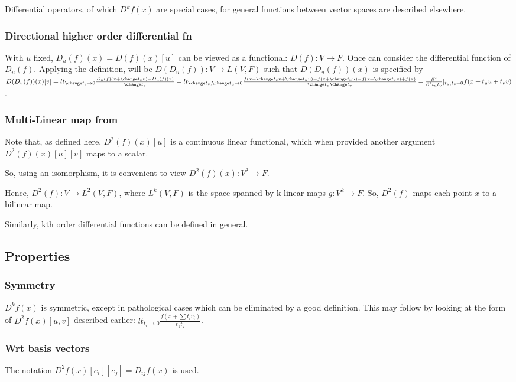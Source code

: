 \documentclass[oneside, article]{memoir}
\begin{document}
Differential operators, of which $D^{k}f(x)$ are special cases, for general functions between vector spaces are described elsewhere.

\subsubsection{Directional higher order differential fn}
With $u$ fixed, $D_u(f)(x) = D(f)(x)[u]$ can be viewed as a  functional: $D(f):V \to F$. Once can consider the differential function of $D_u(f)$. Applying the definition, will be $D(D_u(f)):V \to L(V, F)$ such that $D(D_u(f))(x)$ is specified by $D(D_u(f))(x)[v] = lt_{\change t_v \to 0} \frac{D_u(f)(x + \change t_v v) - D_u(f)(x)}{\change t_v} = \\
lt_{\change t_v, \change t_u \to 0} \frac{f(x + \change t_v v + \change t_u u) - f(x + \change t_u u)- f(x + \change t_v v ) + f(x)}{\change t_u \change t_v} \\
= \frac{\partial^{2} }{\partial^{2} t_u t_v}|_{t_u, t_v = 0} f(x + t_u u + t_v v)$.

\subsubsection{Multi-Linear map from }
Note that, as defined here, $D^2(f)(x)[u]$ is a continuous linear functional, which when provided another argument $D^2(f)(x)[u][v]$ maps to a scalar.

So, using an isomorphism, it is convenient to view $D^2(f)(x): V^{2} \to F$.

Hence, $D^2(f): V \to L^{2}(V, F)$, where $L^{k}(V, F)$ is the space spanned by k-linear maps $g:V^{k} \to F$. So, $D^2(f)$ maps each point $x$ to a bilinear map.

Similarly, kth order differential functions can be defined in general.

\subsection{Properties}
\subsubsection{Symmetry}
$D^{k}f(x)$ is symmetric, except in pathological cases which can be eliminated by a good definition. This may follow by looking at the form of $D^{2}f(x)[u, v]$ described earlier: $lt_{t_i \to 0} \frac{f(x + \sum t_i v_i)}{t_1 t_2}$.

\subsubsection{Wrt basis vectors}
The notation $D^{2}f(x)[e_i][e_j] = D_{ij}f(x)$ is used.
\end{document}
